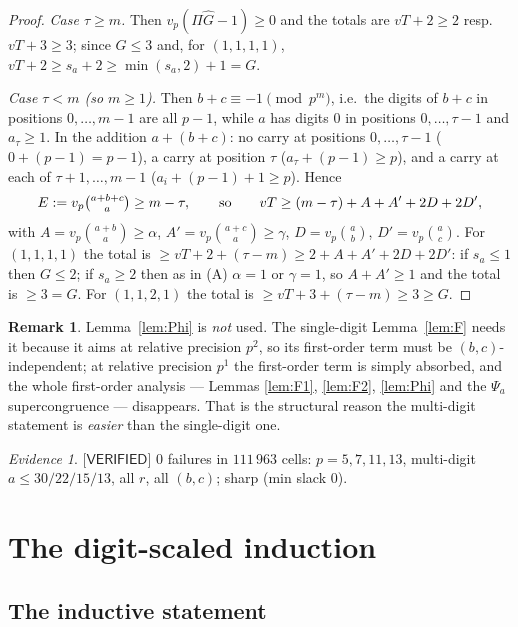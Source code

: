 \documentclass[11pt,reqno]{amsart}
\theoremstyle{plain}
\theoremstyle{definition}
\newtheorem{remark}[theorem]{Remark}
\theoremstyle{remark}
\newtheorem{evidence}[theorem]{Evidence}
\numberwithin{equation}{section}
\newcommand{\VERIFIED}{\textsf{[VERIFIED]}}
\begin{document}
\begin{proof}
\emph{Case $\tau\ge m$.} Then $v_p(\Pi\hat G-1)\ge0$ and the totals are $vT+2\ge2$ resp.
$vT+3\ge3$; since $G\le3$ and, for $(1,1,1,1)$, $vT+2\ge s_a+2\ge\min(s_a,2)+1=G$.

\emph{Case $\tau<m$ (so $m\ge1$).} Then $b+c\equiv-1\pmod{p^m}$, i.e.\ the digits of $b+c$ in
positions $0,\dots,m-1$ are all $p-1$, while $a$ has digits $0$ in positions $0,\dots,\tau-1$
and $a_\tau\ge1$. In the addition $a+(b+c)$: no carry at positions $0,\dots,\tau-1$
($0+(p-1)=p-1$), a carry at position $\tau$ ($a_\tau+(p-1)\ge p$), and a carry at each of
$\tau+1,\dots,m-1$ ($a_i+(p-1)+1\ge p$). Hence
\[
E:=v_p\tbinom{a+b+c}{a}\ge m-\tau,\qquad\text{so}\qquad vT\ge(m-\tau)+A+A'+2D+2D',
\]
with $A=v_p\binom{a+b}{a}\ge\alpha$, $A'=v_p\binom{a+c}{a}\ge\gamma$, $D=v_p\binom ab$,
$D'=v_p\binom ac$. For $(1,1,1,1)$ the total is $\ge vT+2+(\tau-m)\ge2+A+A'+2D+2D'$: if
$s_a\le1$ then $G\le2$; if $s_a\ge2$ then as in (A) $\alpha=1$ or $\gamma=1$, so $A+A'\ge1$ and
the total is $\ge3=G$. For $(1,1,2,1)$ the total is $\ge vT+3+(\tau-m)\ge3\ge G$.
\end{proof}

\begin{remark}
Lemma~\ref{lem:Phi} is \emph{not} used. The single-digit Lemma~\ref{lem:F} needs it because it
aims at relative precision $p^2$, so its first-order term must be $(b,c)$-independent; at
relative precision $p^1$ the first-order term is simply absorbed, and the whole first-order
analysis --- Lemmas \ref{lem:F1}, \ref{lem:F2}, \ref{lem:Phi} and the $\Psi_a$
supercongruence --- disappears. That is the structural reason the multi-digit statement is
\emph{easier} than the single-digit one.
\end{remark}

\begin{evidence}\label{ev:Fgen}
$\VERIFIED$ $0$ failures in $111\,963$ cells: $p=5,7,11,13$, multi-digit $a\le30/22/15/13$, all
$r$, all $(b,c)$; sharp (min slack $0$).
\end{evidence}

\section{The digit-scaled induction}\label{sec:IND}

\subsection{The inductive statement}
\end{document}
